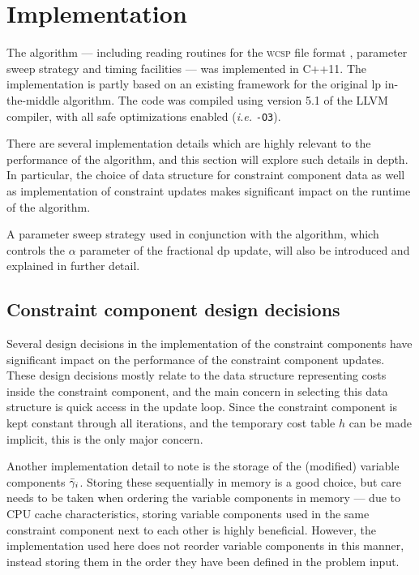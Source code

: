 \section{Implementation}
The algorithm --- including reading routines for the \textsc{wcsp} file format \parencite{wcspformat}, parameter sweep strategy and timing facilities --- was implemented in C++11.
The implementation is partly based on an existing framework for the original \gls{lp} in-the-middle algorithm.
The code was compiled using version 5.1 of the LLVM compiler, with all safe optimizations enabled (\emph{i.e.} \texttt{-O3}).

There are several implementation details which are highly relevant to the performance of the algorithm, and this section will explore such details in depth.
In particular, the choice of data structure for constraint component data as well as implementation of constraint updates makes significant impact on the runtime of the algorithm.

A parameter sweep strategy used in conjunction with the algorithm, which controls the \(\alpha\) parameter of the fractional \gls{dp} update, will also be introduced and explained in further detail.

\subsection{Constraint component design decisions}
Several design decisions in the implementation of the constraint components have significant impact on the performance of the constraint component updates.
These design decisions mostly relate to the data structure representing costs inside the constraint component, and the main concern in selecting this data structure is quick access in the update loop.
Since the constraint component is kept constant through all iterations, and the temporary cost table \(h\) can be made implicit, this is the only major concern.

Another implementation detail to note is the storage of the (modified) variable components \(\bar{\gamma}_i\).
Storing these sequentially in memory is a good choice, but care needs to be taken when ordering the variable components in memory --- due to CPU cache characteristics, storing variable components used in the same constraint component next to each other is highly beneficial.
However, the implementation used here does not reorder variable components in this manner, instead storing them in the order they have been defined in the problem input.

